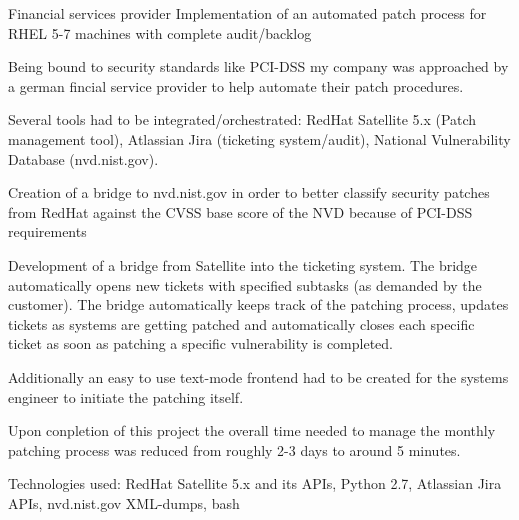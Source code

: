 \begin{cventries}
  \cventry
    {Financial services provider} {Implementation of an automated patch process for RHEL 5-7 machines with complete audit/backlog} {}
    {}
    {
      \begin{cvitems}
      \item Being bound to security standards like PCI-DSS my company was approached by a german
        fincial service provider to help automate their patch procedures.
      \item Several tools had to be
        integrated/orchestrated: RedHat Satellite 5.x (Patch management tool), Atlassian Jira
        (ticketing system/audit), National Vulnerability Database (nvd.nist.gov).
      \item Creation of a bridge to nvd.nist.gov in order to better classify security patches from
        RedHat against the CVSS base score of the NVD because of PCI-DSS requirements
      \item Development of a bridge from Satellite into the ticketing system. The bridge
        automatically opens new tickets with specified subtasks (as demanded by the customer). The
        bridge automatically keeps track of the patching process, updates tickets as systems are
        getting patched and automatically closes each specific ticket as soon as patching a specific
        vulnerability is completed.
      \item Additionally an easy to use text-mode frontend had to be created for the systems engineer to initiate the patching itself.
      \item Upon conpletion of this project the overall time needed to manage the monthly patching
        process was reduced from roughly 2-3 days to around 5 minutes.
      \item Technologies used: RedHat Satellite 5.x and its APIs, Python 2.7, Atlassian Jira APIs,
        nvd.nist.gov XML-dumps, bash
      \end{cvitems}
    }


\end{cventries}
